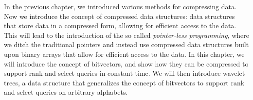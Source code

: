 
In the previous chapter, we introduced various methods for compressing data. Now we introduce the concept of compressed data structures: data structures that store data in a compressed form, allowing for efficient access to the data. This will lead to the introduction of the so called \emph{pointer-less programming}, where we ditch the traditional pointers and instead use compressed data structures built upon binary arrays that allow for efficient access to the data. In this chapter, we will introduce the concept of bitvectors, and show how they can be compressed to support rank and select queries in constant time. We will then introduce wavelet trees, a data structure that generalizes the concept of bitvectors to support rank and select queries on arbitrary alphabets.


